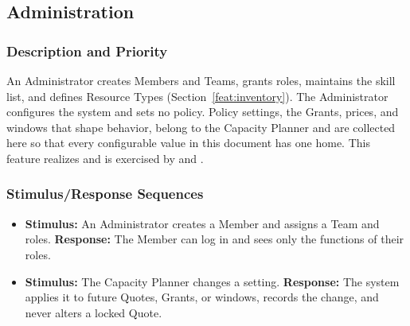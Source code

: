 \subsection{Administration}\label{feat:admin}

\subsubsection{Description and Priority}
An Administrator creates Members and Teams, grants roles, maintains the skill list, and defines Resource Types (Section~\ref{feat:inventory}). The Administrator configures the system and sets no policy. Policy settings, the Grants, prices, and windows that shape behavior, belong to the Capacity Planner and are collected here so that every configurable value in this document has one home. This feature realizes  and is exercised by  and . 

\subsubsection{Stimulus/Response Sequences}
\begin{itemize}
  \item \textbf{Stimulus:} An Administrator creates a Member and assigns a Team and roles. \textbf{Response:} The Member can log in and sees only the functions of their roles.
  \item \textbf{Stimulus:} The Capacity Planner changes a setting. \textbf{Response:} The system applies it to future Quotes, Grants, or windows, records the change, and never alters a locked Quote.
\end{itemize}

